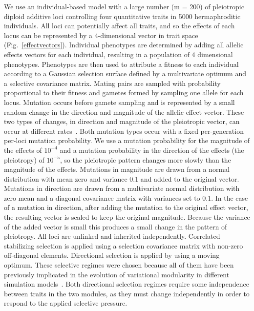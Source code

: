\begin{refsection}
We use an individual-based model with a large number (m = 200) of pleiotropic
diploid additive loci controlling four quantitative traits in 5000
hermaphroditic individuals. All loci can potentially affect all traits, and so
the effects of each locus can be represented by a 4-dimensional vector in
trait space (Fig.~\ref{effectvectors}). Individual phenotypes are determined
by adding all allelic effects vectors for each individual, resulting in a
population of 4 dimensional phenotypes. Phenotypes are then used to attribute
a fitness to each individual according to a Gaussian selection surface defined
by a multivariate optimum and a selective covariance matrix. Mating pairs are
sampled with probability proportional to their fitness and gametes formed by
sampling one allele for each locus. Mutation occurs before gamete sampling and
is represented by a small random change in the direction and magnitude of the
allelic effect vector. These two types of changes, in direction and magnitude
of the pleiotropic vector, can occur at different rates~\parencite[for a
discussion on both types of mutations see][]{Draghi2010-ye}. Both mutation
types occur with a fixed per-generation per-loci mutation probability. We use
a mutation probability for the magnitude of the effects of $10^{-4}$ and a
mutation probability in the direction of the effects (the pleiotropy) of
$10^{-5}$, so the pleiotropic pattern changes more slowly than the magnitude
of the effects. Mutations in magnitude are drawn from a normal distribution
with mean zero and variance 0.1 and added to the original vector. Mutations in
direction are drawn from a multivariate normal distribution with zero mean and
a diagonal covariance matrix with variances set to 0.1. In the case of a
mutation in direction, after adding the mutation to the original effect
vector, the resulting vector is scaled to keep the original magnitude. Because the
variance of the added vector is small this produces a small change in the
pattern of pleiotropy. All loci are unlinked and inherited independently.
Correlated stabilizing selection is applied using a selection covariance
matrix with non-zero off-diagonal elements. Directional selection is applied
by using a moving optimum. These selective regimes were chosen because all of
them have been previously implicated in the evolution of variational
modularity in different simulation models~\parencite{Jones2014-wj,
Melo2015-bk}. Both directional selection regimes require some independence
between traits in the two modules, as they must change independently in order
to respond to the applied selective pressure.


\end{refsection}
